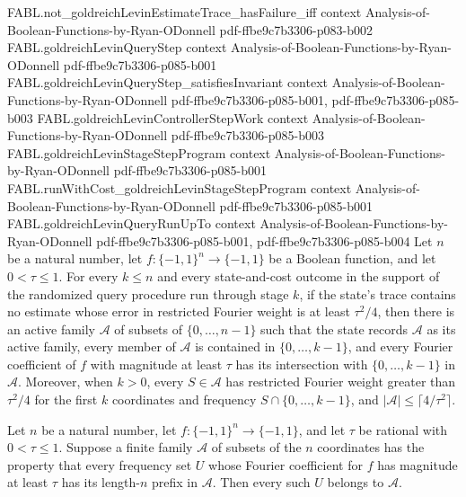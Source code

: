 \begin{theorem}
\proofstep
  {FABL.not_goldreichLevinEstimateTrace_hasFailure_iff}
  {context}
  {Analysis-of-Boolean-Functions-by-Ryan-ODonnell}
  {pdf-ffbe9c7b3306-p083-b002}
\proofstep
  {FABL.goldreichLevinQueryStep}
  {context}
  {Analysis-of-Boolean-Functions-by-Ryan-ODonnell}
  {pdf-ffbe9c7b3306-p085-b001}
\proofstep
  {FABL.goldreichLevinQueryStep_satisfiesInvariant}
  {context}
  {Analysis-of-Boolean-Functions-by-Ryan-ODonnell}
  {pdf-ffbe9c7b3306-p085-b001,
    pdf-ffbe9c7b3306-p085-b003}
\proofstep
  {FABL.goldreichLevinControllerStepWork}
  {context}
  {Analysis-of-Boolean-Functions-by-Ryan-ODonnell}
  {pdf-ffbe9c7b3306-p085-b003}
\proofstep
  {FABL.goldreichLevinStageStepProgram}
  {context}
  {Analysis-of-Boolean-Functions-by-Ryan-ODonnell}
  {pdf-ffbe9c7b3306-p085-b001}
\proofstep
  {FABL.runWithCost_goldreichLevinStageStepProgram}
  {context}
  {Analysis-of-Boolean-Functions-by-Ryan-ODonnell}
  {pdf-ffbe9c7b3306-p085-b001}
\proofstep
  {FABL.goldreichLevinQueryRunUpTo}
  {context}
  {Analysis-of-Boolean-Functions-by-Ryan-ODonnell}
  {pdf-ffbe9c7b3306-p085-b001,
    pdf-ffbe9c7b3306-p085-b004}
Let $n$ be a natural number, let $f:\{-1,1\}^n\to\{-1,1\}$ be a Boolean function, and
let $0<\tau\le 1$. For every $k\le n$ and every state-and-cost outcome in the support of
the randomized query procedure run through stage $k$, if the state’s trace contains no
estimate whose error in restricted Fourier weight is at least $\tau^2/4$, then there is
an active family $\mathcal A$ of subsets of $\{0,\ldots,n-1\}$ such that the state
records $\mathcal A$ as its active family, every member of $\mathcal A$ is contained in
$\{0,\ldots,k-1\}$, and every Fourier coefficient of $f$ with magnitude at least $\tau$
has its intersection with $\{0,\ldots,k-1\}$ in $\mathcal A$. Moreover, when $k>0$,
every $S\in\mathcal A$ has restricted Fourier weight greater than $\tau^2/4$ for the
first $k$ coordinates and frequency $S\cap\{0,\ldots,k-1\}$, and $|\mathcal
A|\le\lceil4/\tau^2\rceil$.
\end{theorem}

\begin{theorem}
\label{FABL.goldreichLevinActiveInvariant_complete}
\leanok
{}
Let $n$ be a natural number, let $f:\{-1,1\}^n\to\{-1,1\}$, and let $\tau$ be rational
with $0<\tau\le 1$. Suppose a finite family $\mathcal A$ of subsets of the $n$
coordinates has the property that every frequency set $U$ whose Fourier coefficient for
$f$ has magnitude at least $\tau$ has its length-$n$ prefix in $\mathcal A$. Then every
such $U$ belongs to $\mathcal A$.
\end{theorem}


